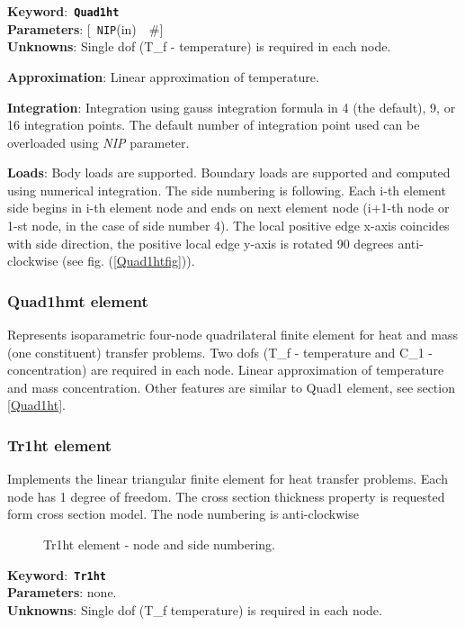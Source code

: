 \documentclass[a4paper]{article}
\newcommand{\descitem}[1]{{\noindent \bf #1}:}
\newcommand{\elemkeyword}[1]{\descitem{Keyword}~{\bf \texttt{#1}}}
\newcommand{\elemparam}[2]{{{\texttt{#1}\tiny (#2)}~~\#}}
\newcommand{\optelemparam}[2]{{[~\elemparam{#1}{#2}]}}
\newcommand{\param}[1]{{\em #1}}
\begin{document}
\elemkeyword{Quad1ht}\\
\descitem{Parameters} \optelemparam{NIP}{in}\\
\descitem{Unknowns}
Single dof (T\_f - temperature) is required in each node.

\descitem{Approximation} Linear approximation of temperature.

\descitem{Integration}
Integration using gauss integration formula
in 4 (the default), 9, or 16 integration points. The default number of
integration point used can be overloaded using \param{NIP} parameter.

\descitem{Loads} Body loads are supported. Boundary loads are
supported and computed using numerical integration. The side numbering is
following. Each i-th element side begins in i-th element node and
ends on next element node (i+1-th node or 1-st node, in the case of 
side number 4). The local positive edge x-axis coincides with side
direction, the positive local edge y-axis is rotated 90 degrees
anti-clockwise (see fig. (\ref{Quad1htfig})).

\subsubsection{Quad1hmt element}
Represents isoparametric four-node quadrilateral finite element for
heat and mass (one constituent) transfer problems. 
Two dofs (T\_f - temperature and C\_1 - concentration) are required in
each node. Linear approximation of temperature and mass concentration.
Other features are similar to Quad1 element, see section \ref{Quad1ht}.

\subsubsection{Tr1ht element}
\label{Tr1ht}
Implements the linear triangular finite element for heat transfer problems. Each node has 1 degree of freedom.
The cross section thickness property is requested form cross section model.
The node numbering is anti-clockwise

\begin{figure}[htb]
 \centering
 \begin{makeimage}
  
 \end{makeimage}
 \caption{Tr1ht element - node and side numbering.}
 \label{Tr1htfig}
\end{figure}

\elemkeyword{Tr1ht}\\
\descitem{Parameters} none.\\
\descitem{Unknowns}
Single dof (T\_f temperature) is  required in each node.
\end{document}
